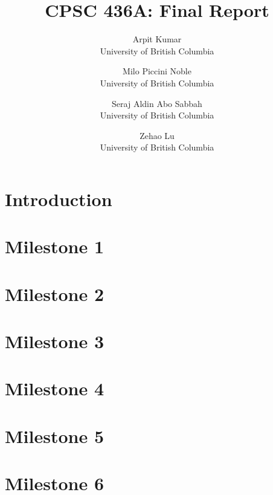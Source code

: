 \documentclass[letterpaper,twocolumn,10pt]{article}
\begin{document}
	
	\date{}
	
	\title{CPSC 436A: Final Report}
	
	\author{
		{\rm Arpit Kumar}\\
		University of British Columbia
		\and
		{\rm Milo Piccini Noble}\\
		University of British Columbia
		\and
		{\rm Seraj Aldin Abo Sabbah}\\
		University of British Columbia
		\and
		{\rm Zehao Lu}\\
		University of British Columbia
	}
	
	\maketitle
	
\section*{Introduction}


\section*{Milestone 1}


\section*{Milestone 2}


\section*{Milestone 3}


\section*{Milestone 4}


\section*{Milestone 5}


\section*{Milestone 6}

\end{document}
